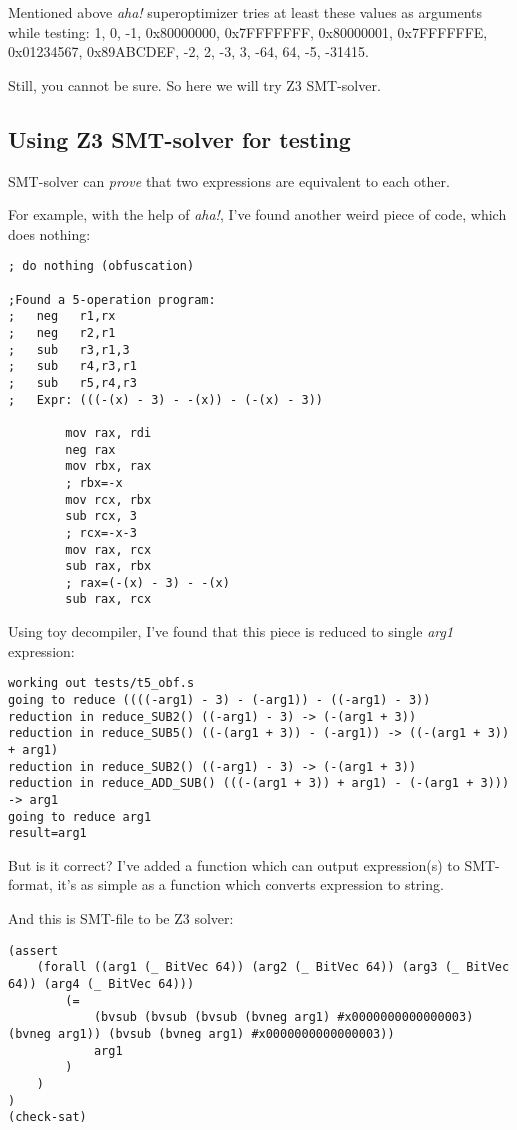 ﻿\documentclass[12pt]{article}
\begin{document}
Mentioned above \textit{aha!} superoptimizer tries at least these values as arguments while testing:
1, 0, -1, 0x80000000, 0x7FFFFFFF, 0x80000001, 0x7FFFFFFE, 0x01234567, 0x89ABCDEF, -2, 2, -3, 3,
-64, 64, -5, -31415.

Still, you cannot be sure.
So here we will try Z3 SMT-solver.

\subsection{Using Z3 SMT-solver for testing}

SMT-solver can \textit{prove} that two expressions are equivalent to each other.

For example, with the help of \textit{aha!}, I've found another weird piece of code, which does nothing:

\begin{lstlisting}
; do nothing (obfuscation)

;Found a 5-operation program:
;   neg   r1,rx
;   neg   r2,r1
;   sub   r3,r1,3
;   sub   r4,r3,r1
;   sub   r5,r4,r3
;   Expr: (((-(x) - 3) - -(x)) - (-(x) - 3))

        mov rax, rdi
        neg rax
        mov rbx, rax
        ; rbx=-x
        mov rcx, rbx
        sub rcx, 3
        ; rcx=-x-3
        mov rax, rcx
        sub rax, rbx
        ; rax=(-(x) - 3) - -(x)
        sub rax, rcx
\end{lstlisting}

Using toy decompiler, I've found that this piece is reduced to single \textit{arg1} expression:

\begin{lstlisting}
working out tests/t5_obf.s
going to reduce ((((-arg1) - 3) - (-arg1)) - ((-arg1) - 3))
reduction in reduce_SUB2() ((-arg1) - 3) -> (-(arg1 + 3))
reduction in reduce_SUB5() ((-(arg1 + 3)) - (-arg1)) -> ((-(arg1 + 3)) + arg1)
reduction in reduce_SUB2() ((-arg1) - 3) -> (-(arg1 + 3))
reduction in reduce_ADD_SUB() (((-(arg1 + 3)) + arg1) - (-(arg1 + 3))) -> arg1
going to reduce arg1
result=arg1
\end{lstlisting}

But is it correct?
I've added a function which can output expression(s) to SMT-format, it's as simple as a function which converts
expression to string.

And this is SMT-file to be Z3 solver:

\begin{lstlisting}
(assert
    (forall ((arg1 (_ BitVec 64)) (arg2 (_ BitVec 64)) (arg3 (_ BitVec 64)) (arg4 (_ BitVec 64)))
        (=
            (bvsub (bvsub (bvsub (bvneg arg1) #x0000000000000003) (bvneg arg1)) (bvsub (bvneg arg1) #x0000000000000003))
            arg1
        )
    )
)
(check-sat)
\end{lstlisting}
\end{document}
